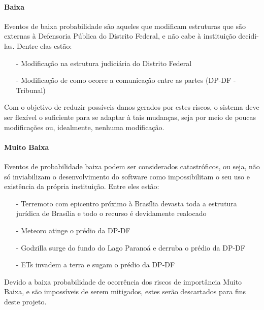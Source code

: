 \documentclass[12pt,a4paper]{report}
\begin{document}
\paragraph{Baixa} Eventos de baixa probabilidade são aqueles que modificam estruturas que são externas à Defensoria Pública do Distrito Federal, e não cabe à instituição decidi-las. Dentre elas estão:
\begin{itemize}
\item [-] Modificação na estrutura judiciária do Distrito Federal
\item [-] Modificação de como ocorre a comunicação entre as partes (DP-DF - Tribunal)
\end{itemize}

Com o objetivo de reduzir possíveis danos gerados por estes riscos, o sistema deve ser flexível o suficiente para se adaptar à tais mudanças, seja por meio de poucas modificações ou, idealmente, nenhuma modificação.

\paragraph{Muito Baixa} Eventos de probabilidade baixa podem ser considerados catastróficos, ou seja, não só inviabilizam o desenvolvimento do software como impossibilitam o seu uso e existência da própria instituição. Entre eles estão:
\begin{itemize}
\item [-] Terremoto com epicentro próximo à Brasília devasta toda a estrutura jurídica de Brasília e todo o recurso é devidamente realocado
\item [-] Meteoro atinge o prédio da DP-DF
\item [-] Godzilla surge do fundo do Lago Paranoá e derruba o prédio da DP-DF
\item [-] ETs invadem a terra e sugam o prédio da DP-DF
\end{itemize}


Devido a baixa probabilidade de ocorrência dos riscos de importância Muito Baixa, e são impossíveis de serem mitigados, estes serão descartados para fins deste projeto. 



\end{document}
